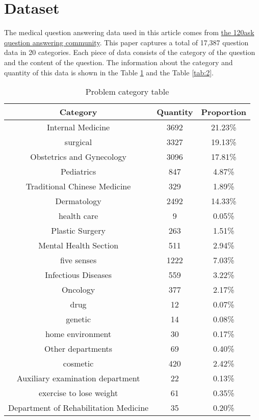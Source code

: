 \documentclass{article}
\begin{document}
\section{Dataset}
The medical question answering data used in this article comes from  \href{https://www.120ask.com/list/}{the 120ask question answering community}. This paper captures a total of 17,387 question data in 20 categories. Each piece of data consists of the category of the question and the content of the question. The information about the category and quantity of this data is shown in the Table \ref{tab:1} and the Table \ref{tab:2}.
\begin{table}[h!]
    \caption{Problem category table}    
    \centering
    \begin{tabular}{ccc}
            \hline
Category & Quantity & Proportion\\
\hline
Internal Medicine & 3692 & 21.23\% \\
surgical & 3327 & 19.13\% \\
Obstetrics and Gynecology & 3096& 17.81\%    \\
Pediatrics & 847 & 4.87\%     \\
Traditional Chinese Medicine          & 329      & 1.89\%      \\
Dermatology                           & 2492     & 14.33\%     \\
health care                           & 9        & 0.05\%     \\
Plastic Surgery                       & 263      & 1.51\%     \\
Mental Health Section                 & 511      & 2.94\%     \\
five senses                           & 1222     & 7.03\%     \\
Infectious Diseases                   & 559      & 3.22\%      \\
Oncology                              & 377      & 2.17\%      \\
drug                                  & 12       & 0.07\%    \\
genetic                               & 14       & 0.08\%      \\
home environment                      & 30       & 0.17\%      \\
Other departments                     & 69       & 0.40\%     \\
cosmetic                              & 420      & 2.42\%    \\
Auxiliary examination department      & 22       & 0.13\%     \\
exercise to lose weight               & 61       & 0.35\%     \\
Department of Rehabilitation Medicine & 35       & 0.20\%     \\
            \hline
            \end{tabular}
    \label{tab:1}
\end{table}
\end{document}
